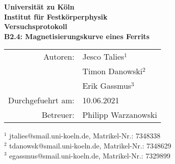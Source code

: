 \documentclass{article}
\begin{document}
 
 
\thispagestyle{empty}
\vspace*{\fill}
\begin{center}
	\Huge
	\textbf{Universität zu Köln}\\
	\LARGE
	\textbf{Institut für Festkörperphysik}\\
	\vspace{2cm}
	\textbf{Versuchsprotokoll}\\  
	\vspace{0.5cm}
	\large
	\textbf{B2.4: Magnetisierungskurve eines Ferrits}\\
	\normalsize
	\vspace{2cm}
	\begin{tabular}{r l}
		Autoren: 	& Jesco Talies$^1$\\
					& Timon Danowski$^2$\\
                    & Erik Gassmus$^3$\\
		Durchgefuehrt am:	& 10.06.2021\\
		Betreuer:	& Philipp Warzanowski
	\end{tabular}
\end{center}
\vfill\footnotesize
$^1$ jtalies@smail.uni-koeln.de, Matrikel-Nr.: 7348338\\
$^2$ tdanowsk@smail.uni-koeln.de, Matrikel-Nr.: 7348629\\
$^3$ egassmus@smail.uni-koeln.de, Matrikel-Nr.: 7329899\\
\normalsize

\newpage
\thispagestyle{empty}
\tableofcontents
\clearpage
\setcounter{page}{1}
  
   
  

% 

%
\end{document}
